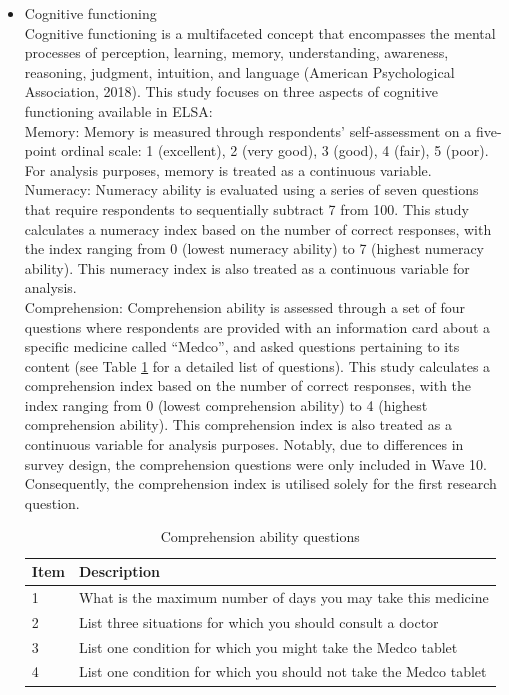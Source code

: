 \begin{itemize}[wide=0pt, leftmargin=*, labelwidth=0pt, labelindent=\parindent, itemindent=0pt]
    \item Cognitive functioning \\
    Cognitive functioning is a multifaceted concept that encompasses the mental processes of perception, learning, memory, understanding, awareness, reasoning, judgment, intuition, and language (American Psychological Association, 2018). This study focuses on three aspects of cognitive functioning available in ELSA: \\
    Memory: Memory is measured through respondents' self-assessment on a five-point ordinal scale: 1 (excellent), 2 (very good), 3 (good), 4 (fair), 5 (poor). For analysis purposes, memory is treated as a continuous variable. \\
    Numeracy: Numeracy ability is evaluated using a series of seven questions that require respondents to sequentially subtract 7 from 100. This study calculates a numeracy index based on the number of correct responses, with the index ranging from 0 (lowest numeracy ability) to 7 (highest numeracy ability). This numeracy index is also treated as a continuous variable for analysis. \\
    Comprehension: Comprehension ability is assessed through a set of four questions where respondents are provided with an information card about a specific medicine called ``Medco”, and asked questions pertaining to its content (see Table \ref{tab:comprehension} for a detailed list of questions). This study calculates a comprehension index based on the number of correct responses, with the index ranging from 0 (lowest comprehension ability) to 4 (highest comprehension ability). This comprehension index is also treated as a continuous variable for analysis purposes. Notably, due to differences in survey design, the comprehension questions were only included in Wave 10. Consequently, the comprehension index is utilised solely for the first research question.

    \begin{table}[h!]
        \centering
        \caption{Comprehension ability questions}
        \label{tab:comprehension}
        \begin{tabular}{ll}
            \toprule
            Item & Description \\
            \midrule
            1 & What is the maximum number of days you may take this medicine \\
            2 & List three situations for which you should consult a doctor \\
            3 & List one condition for which you might take the Medco tablet \\
            4 & List one condition for which you should not take the Medco tablet \\
            \bottomrule
        \end{tabular}
    \end{table}

\end{itemize}

